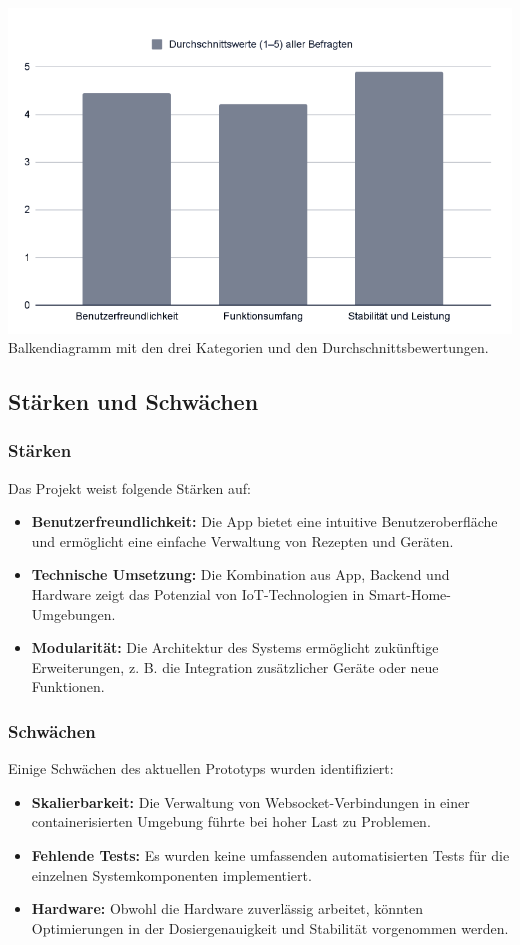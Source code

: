 \includegraphics[width=\textwidth]{graphics/graphs/app-test.png} Balkendiagramm mit den drei Kategorien und den Durchschnittsbewertungen.

\subsection{Stärken und Schwächen}

\subsubsection*{Stärken}

Das Projekt weist folgende Stärken auf:
\begin{itemize}
  \item \textbf{Benutzerfreundlichkeit:} Die App bietet eine intuitive Benutzeroberfläche und ermöglicht eine einfache Verwaltung von Rezepten und Geräten.
  \item \textbf{Technische Umsetzung:} Die Kombination aus App, Backend und Hardware zeigt das Potenzial von IoT-Technologien in Smart-Home-Umgebungen.
  \item \textbf{Modularität:} Die Architektur des Systems ermöglicht zukünftige Erweiterungen, z. B. die Integration zusätzlicher Geräte oder neue Funktionen.
\end{itemize}

\subsubsection*{Schwächen}

Einige Schwächen des aktuellen Prototyps wurden identifiziert:
\begin{itemize}
  \item \textbf{Skalierbarkeit:} Die Verwaltung von Websocket-Verbindungen in einer containerisierten Umgebung führte bei hoher Last zu Problemen.
  \item \textbf{Fehlende Tests:} Es wurden keine umfassenden automatisierten Tests für die einzelnen Systemkomponenten implementiert.
  \item \textbf{Hardware:} Obwohl die Hardware zuverlässig arbeitet, könnten Optimierungen in der Dosiergenauigkeit und Stabilität vorgenommen werden.
\end{itemize}

